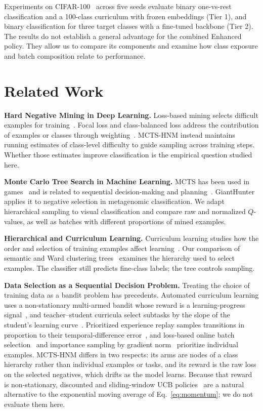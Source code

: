 \documentclass[11pt]{article}
\begin{document}
Experiments on CIFAR-100~\cite{krizhevsky2009learning} across five seeds evaluate binary one-vs-rest classification and a 100-class curriculum with frozen embeddings (Tier 1), and binary classification for three target classes with a fine-tuned backbone (Tier 2). The results do not establish a general advantage for the combined Enhanced policy. They allow us to compare its components and examine how class exposure and batch composition relate to performance.

\section{Related Work}
\label{sec:related}

\textbf{Hard Negative Mining in Deep Learning.} Loss-based mining selects difficult examples for training~\cite{shrivastava2016training,he2016deep}. Focal loss and class-balanced loss address the contribution of examples or classes through weighting~\cite{lin2017focal,cui2019class}. MCTS-HNM instead maintains running estimates of class-level difficulty to guide sampling across training steps. Whether those estimates improve classification is the empirical question studied here.

\textbf{Monte Carlo Tree Search in Machine Learning.} MCTS has been used in games~\cite{silver2016mastering} and is related to sequential decision-making and planning~\cite{sutton2018reinforcement}. GiantHunter~\cite{qu2025gianthunter} applies it to negative selection in metagenomic classification. We adapt hierarchical sampling to visual classification and compare raw and normalized $Q$-values, as well as batches with different proportions of mined examples.

\textbf{Hierarchical and Curriculum Learning.} Curriculum learning studies how the order and selection of training examples affect learning~\cite{bengio2009curriculum}. Our comparison of semantic and Ward clustering trees~\cite{ward1963hierarchical} examines the hierarchy used to select examples. The classifier still predicts fine-class labels; the tree controls sampling.

\textbf{Data Selection as a Sequential Decision Problem.} Treating the choice of training data as a bandit problem has precedents. Automated curriculum learning uses a non-stationary multi-armed bandit whose reward is a learning-progress signal~\cite{graves2017automated}, and teacher--student curricula select subtasks by the slope of the student's learning curve~\cite{matiisen2020teacher}. Prioritized experience replay samples transitions in proportion to their temporal-difference error~\cite{schaul2016prioritized}, and loss-based online batch selection~\cite{loshchilov2015online} and importance sampling by gradient norm~\cite{katharopoulos2018not} prioritize individual examples. MCTS-HNM differs in two respects: its arms are nodes of a class hierarchy rather than individual examples or tasks, and its reward is the raw loss on the selected negatives, which drifts as the model learns. Because that reward is non-stationary, discounted and sliding-window UCB policies~\cite{garivier2011upper} are a natural alternative to the exponential moving average of Eq.~\eqref{eq:momentum}; we do not evaluate them here.
\end{document}
